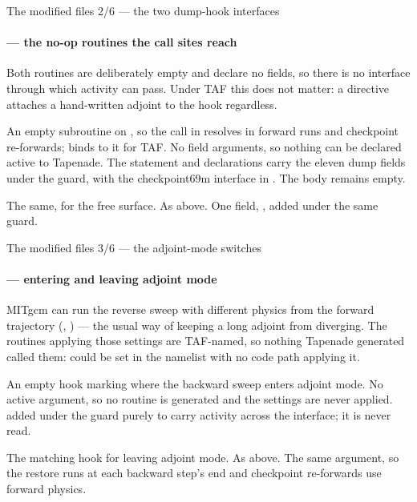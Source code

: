 \begin{frame}{The modified files 2/6 --- the two dump-hook interfaces}
  \framesubtitle{ --- the no-op routines the call sites reach}

\Gap
Both routines are deliberately empty and declare no fields, so there is no
interface through which activity can pass. Under TAF this does not matter: a
 directive attaches a hand-written adjoint to the hook regardless.

{An empty subroutine on , so the call in
 resolves in forward runs and checkpoint re-forwards;
 binds  to it for TAF.}
{No field arguments, so nothing can be declared active to Tapenade.}
{The  statement and declarations carry the eleven dump fields
under the  guard, with the checkpoint69m interface in
. The body remains empty.}

{The same, for the free surface.}
{As above.}
{One field, , added under the same guard.}

\end{frame}


\begin{frame}{The modified files 3/6 --- the adjoint-mode switches}
  \framesubtitle{ --- entering and leaving adjoint mode}

\Gap
MITgcm can run the reverse sweep with different physics from the forward
trajectory (, \code{\vfin}) --- the usual way of keeping a long
adjoint from diverging. The routines applying those settings are TAF-named, so
nothing Tapenade generated called them:  could be set in the
namelist with no code path applying it.

{An empty hook marking where the backward sweep enters adjoint mode.}
{No active argument, so no  routine is generated and the settings are
never applied.}
{ added under the  guard purely to carry
activity across the interface; it is never read.}

{The matching hook for leaving adjoint mode.}
{As above.}
{The same argument, so the restore runs at each backward step's end and
checkpoint re-forwards use forward physics.}

\end{frame}


